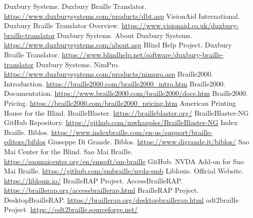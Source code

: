 \begin{thebibliography}{99}
 Duxbury Systems. Duxbury Braille Translator. \url{https://www.duxburysystems.com/products/dbt.asp}
 VisionAid International. Duxbury Braille Translator Overview. \url{https://www.visionaid.co.uk/duxbury-braille-translator}
 Duxbury Systems. About Duxbury Systems. \url{https://www.duxburysystems.com/about.asp}
 Blind Help Project. Duxbury Braille Translator. \url{https://www.blindhelp.net/software/duxbury-braille-translator}
 Duxbury Systems. NimPro. \url{https://www.duxburysystems.com/products/nimpro.asp}
 Braille2000. Introduction. \url{https://braille2000.com/braille2000_intro.htm}
 Braille2000. Documentation. \url{https://www.braille2000.com/braille2000/docs.htm}
 Braille2000. Pricing. \url{https://braille2000.com/braille2000_pricing.htm}
 American Printing House for the Blind. BrailleBlaster. \url{https://brailleblaster.org/}
 BrailleBlaster-NG GitHub Repository. \url{https://github.com/mwhapples/BrailleBlaster-NG}
 Index Braille. Biblos. \url{https://www.indexbraille.com/en-us/support/braille-editors/biblos}
 Giuseppe Di Grande. Biblos. \url{https://www.digrande.it/biblos/}
 Sao Mai Center for the Blind. Sao Mai Braille. \url{https://saomaicenter.org/en/smsoft/sm-braille}
 GitHub. NVDA Add-on for Sao Mai Braille. \url{https://github.com/smbraille/nvda-smb}
 Liblouis. Official Website. \url{https://liblouis.io/}
 BrailleRAP Project. AccessBrailleRAP. \url{https://braillerap.org/accessbraillerap.html}
 BrailleRAP Project. DesktopBrailleRAP. \url{https://braillerap.org/desktopbraillerap.html}
 odt2braille Project. \url{https://odt2braille.sourceforge.net/}
\end{thebibliography}
